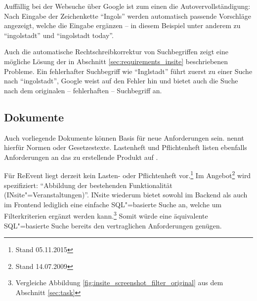 Auffällig bei der Websuche über Google ist zum einen die Autovervollständigung: Nach Eingabe der Zeichenkette \enquote{Ingols} werden automatisch passende Vorschläge angezeigt, welche die Eingabe ergänzen -- in diesem Beispiel unter anderem zu \enquote{ingolstadt} und \enquote{ingolstadt today}.

Auch die automatische Rechtschreibkorrektur von Suchbegriffen zeigt eine mögliche Lösung der in Abschnitt \ref{sec:requirements_insite} beschriebenen Probleme. Ein fehlerhafter Suchbegriff wie \enquote{Inglstadt} führt zuerst zu einer Suche nach \enquote{ingolstadt}, Google weist auf den Fehler hin und bietet auch die Suche nach dem originalen -- fehlerhaften -- Suchbegriff an.


\subsection{Dokumente}
\label{sec:documents}

Auch vorliegende Dokumente können Basis für neue Anforderungen sein. \cite[S. 77]{Rupp.2014} nennt hierfür Normen oder Gesetzestexte. Lastenheft und Pflichtenheft listen ebenfalls Anforderungen an das zu erstellende Produkt auf \cite[S. 48f]{Grande.2014}.

Für ReEvent liegt derzeit kein Lasten- oder Pflichtenheft vor.\footnote{Stand 05.11.2015} Im Angebot\footnote{Stand 14.07.2009} wird spezifiziert: \enquote{Abbildung der bestehenden Funktionalität (INsite"=Veranstaltungen)}. INsite wiederum bietet sowohl im Backend als auch im Frontend lediglich eine einfache SQL"=basierte Suche an, welche um Filterkriterien ergänzt werden kann.\footnote{Vergleiche Abbildung \ref{fig:insite_screenshot_filter_original} aus dem Abschnitt \ref{sec:task}} Somit würde eine äquivalente SQL"=basierte Suche bereits den vertraglichen Anforderungen genügen.



